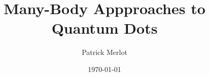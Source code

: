 \documentclass[xcolor=pdftex,hyperref={pdfpagelabels=false},table]{beamer}
\title{Many-Body Appproaches to Quantum Dots}
\author[MSc. in Computational Physics]{Patrick Merlot}
\institute[University of Oslo]{Department of Computational Physics}
\date[UiO]{\today}
\begin{document}
\frame{\titlepage}

\section[Outline]{}
\frame{\tableofcontents}

\end{document}
